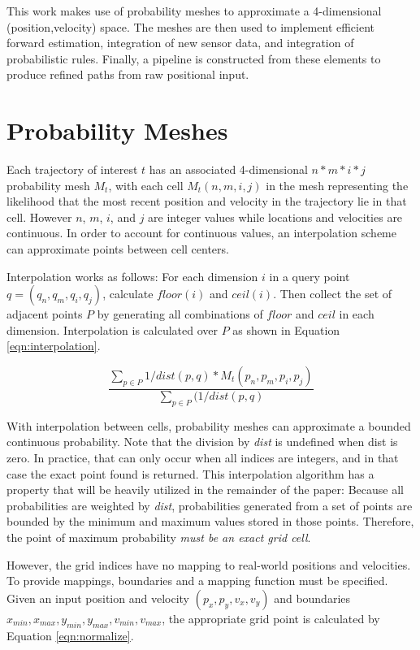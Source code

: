 This work makes use of probability meshes to approximate a 4-dimensional (position,velocity) space. The meshes are then used to implement efficient forward estimation, integration of new sensor data, and integration of probabilistic rules. Finally, a pipeline is constructed from these elements to produce refined paths from raw positional input.

\section{Probability Meshes}

Each trajectory of interest $t$ has an associated 4-dimensional $n*m*i*j$ probability mesh $M_t$, with each cell $M_t(n,m,i,j)$ in the mesh representing the likelihood that the most recent position and velocity in the trajectory lie in that cell.
However $n$, $m$, $i$, and $j$ are integer values while locations and velocities are continuous.
In order to account for continuous values, an interpolation scheme can approximate points between cell centers.

Interpolation works as follows: For each dimension $i$ in a query point $q=(q_n, q_m, q_i, q_j)$, calculate $\mathit{floor}(i)$ and $\mathit{ceil}(i)$. Then collect the set of adjacent points $P$ by generating all combinations of $floor$ and $ceil$ in each dimension. Interpolation is calculated over $P$ as shown in Equation \ref{eqn:interpolation}.

\begin{equation} \label{eqn:interpolation}
    \frac{\sum_{p \in P} 1/\mathit{dist}(p, q) * M_t(p_n, p_m, p_i, p_j)}{\sum_{p \in P} (1/\mathit{dist}(p, q)}
\end{equation}

With interpolation between cells, probability meshes can approximate a bounded continuous probability. Note that the division by \textit{dist} is undefined when dist is zero. In practice, that can only occur when all indices are integers, and in that case the exact point found is returned. This interpolation algorithm has a property that will be heavily utilized in the remainder of the paper: Because all probabilities are weighted by \textit{dist}, probabilities generated from a set of points are bounded by the minimum and maximum values stored in those points. Therefore, the point of maximum probability \textit{must be an exact grid cell}.

However, the grid indices have no mapping to real-world positions and velocities. To provide mappings, boundaries and a mapping function must be specified. Given an input position and velocity $(p_x, p_y, v_x, v_y)$ and boundaries $x_{min}, x_{max}, y_{min}, y_{max}, v_{min}, v_{max}$, the appropriate grid point is calculated by Equation \ref{eqn:normalize}.

